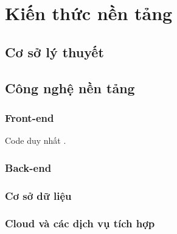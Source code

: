 \chapter{Kiến thức nền tảng} \label{chapter:basic_knowledge}
\section{Cơ sở lý thuyết}
\section{Công nghệ nền tảng}
\subsection{Front-end}
Code duy nhất \cite{flutter}.

\subsection{Back-end}





\subsection{Cơ sở dữ liệu}



\subsection{Cloud và các dịch vụ tích hợp}